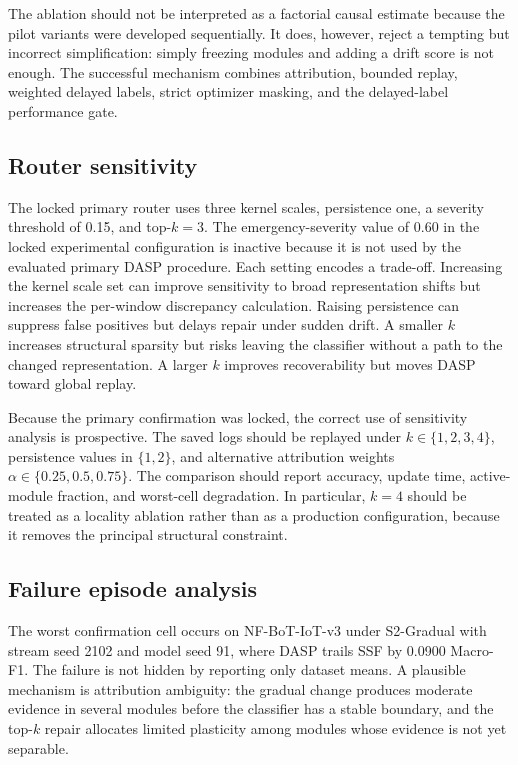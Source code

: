 The ablation should not be interpreted as a factorial causal estimate because the pilot variants were developed sequentially. It does, however, reject a tempting but incorrect simplification: simply freezing modules and adding a drift score is not enough. The successful mechanism combines attribution, bounded replay, weighted delayed labels, strict optimizer masking, and the delayed-label performance gate.

\subsection{Router sensitivity}
The locked primary router uses three kernel scales, persistence one, a severity threshold of 0.15, and top-$k=3$. The emergency-severity value of 0.60 in the locked experimental configuration is inactive because it is not used by the evaluated primary DASP procedure. Each setting encodes a trade-off. Increasing the kernel scale set can improve sensitivity to broad representation shifts but increases the per-window discrepancy calculation. Raising persistence can suppress false positives but delays repair under sudden drift. A smaller $k$ increases structural sparsity but risks leaving the classifier without a path to the changed representation. A larger $k$ improves recoverability but moves DASP toward global replay.

Because the primary confirmation was locked, the correct use of sensitivity analysis is prospective. The saved logs should be replayed under $k\in\{1,2,3,4\}$, persistence values in $\{1,2\}$, and alternative attribution weights $\alpha\in\{0.25,0.5,0.75\}$. The comparison should report accuracy, update time, active-module fraction, and worst-cell degradation. In particular, $k=4$ should be treated as a locality ablation rather than as a production configuration, because it removes the principal structural constraint.

\subsection{Failure episode analysis}
The worst confirmation cell occurs on NF-BoT-IoT-v3 under S2-Gradual with stream seed 2102 and model seed 91, where DASP trails SSF by 0.0900 Macro-F1. The failure is not hidden by reporting only dataset means. A plausible mechanism is attribution ambiguity: the gradual change produces moderate evidence in several modules before the classifier has a stable boundary, and the top-$k$ repair allocates limited plasticity among modules whose evidence is not yet separable.

